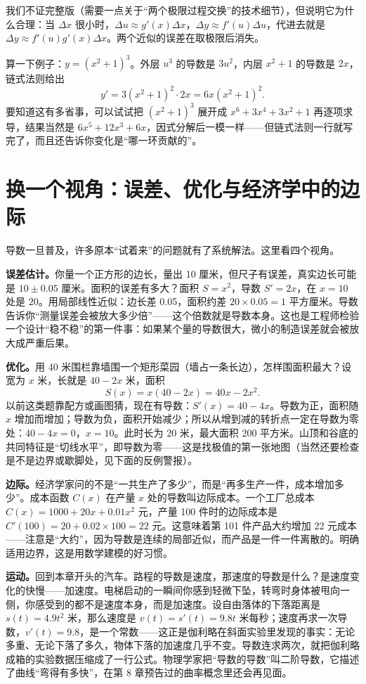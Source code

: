 我们不证完整版（需要一点关于“两个极限过程交换”的技术细节），但说明它为什么合理：当 $\Delta x$ 很小时，$\Delta u\approx g'(x)\Delta x$，$\Delta y\approx f'(u)\Delta u$，代进去就是 $\Delta y\approx f'(u)g'(x)\Delta x$。两个近似的误差在取极限后消失。

算一下例子：$y=(x^2+1)^3$。外层 $u^3$ 的导数是 $3u^2$，内层 $x^2+1$ 的导数是 $2x$，链式法则给出
\[
y'=3(x^2+1)^2\cdot 2x=6x(x^2+1)^2.
\]
要知道这有多省事，可以试试把 $(x^2+1)^3$ 展开成 $x^6+3x^4+3x^2+1$ 再逐项求导，结果当然是 $6x^5+12x^3+6x$，因式分解后一模一样——但链式法则一行就写完了，而且还告诉你变化是“哪一环贡献的”。

\section{换一个视角：误差、优化与经济学中的边际}

导数一旦普及，许多原本“试着来”的问题就有了系统解法。这里看四个视角。

\textbf{误差估计。}你量一个正方形的边长，量出 10 厘米，但尺子有误差，真实边长可能是 $10\pm 0.05$ 厘米。面积的误差有多大？面积 $S=x^2$，导数 $S'=2x$，在 $x=10$ 处是 20。用局部线性近似：边长差 0.05，面积约差 $20\times 0.05=1$ 平方厘米。导数告诉你“测量误差会被放大多少倍”——这个倍数就是导数本身。这也是工程师检验一个设计“稳不稳”的第一件事：如果某个量的导数很大，微小的制造误差就会被放大成严重后果。

\textbf{优化。}用 40 米围栏靠墙围一个矩形菜园（墙占一条长边），怎样围面积最大？设宽为 $x$ 米，长就是 $40-2x$ 米，面积
\[
S(x)=x(40-2x)=40x-2x^2.
\]
以前这类题靠配方或画图猜，现在有导数：$S'(x)=40-4x$。导数为正，面积随 $x$ 增加而增加；导数为负，面积开始减少；所以从增到减的转折点一定在导数为零处：$40-4x=0$，$x=10$。此时长为 20 米，最大面积 200 平方米。山顶和谷底的共同特征是“切线水平”，即导数为零——这是找极值的第一张地图（当然还要检查是不是边界或歇脚处，见下面的反例警报）。

\textbf{边际。}经济学家问的不是“一共生产了多少”，而是“再多生产一件，成本增加多少”。成本函数 $C(x)$ 在产量 $x$ 处的导数叫边际成本。一个工厂总成本 $C(x)=1000+20x+0.01x^2$ 元，产量 100 件时的边际成本是 $C'(100)=20+0.02\times 100=22$ 元。这意味着第 101 件产品大约增加 22 元成本——注意是“大约”，因为导数是连续的局部近似，而产品是一件一件离散的。明确适用边界，这是用数学建模的好习惯。

\textbf{运动。}回到本章开头的汽车。路程的导数是速度，那速度的导数是什么？是速度变化的快慢——加速度。电梯启动的一瞬间你感到轻微下坠，转弯时身体被甩向一侧，你感受到的都不是速度本身，而是加速度。设自由落体的下落距离是 $s(t)=4.9t^2$ 米，那么速度是 $v(t)=s'(t)=9.8t$ 米每秒；速度再求一次导数，$v'(t)=9.8$，是一个常数——这正是伽利略在斜面实验里发现的事实：无论多重、无论下落了多久，物体下落的加速度几乎不变。导数连求两次，就把伽利略成箱的实验数据压缩成了一行公式。物理学家把“导数的导数”叫二阶导数，它描述了曲线“弯得有多快”，在第 8 章预告过的曲率概念里还会再见面。

